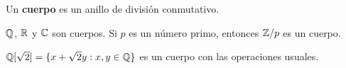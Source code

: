 \begin{definition}
Un \textbf{cuerpo} es un anillo de división conmutativo. 	
\end{definition}

\begin{examples}
$\mathbb{Q}$, $\mathbb{R}$ y $\mathbb{C}$ son cuerpos. Si $p$ es un número primo, entonces $\mathbb{Z}/p$ es un cuerpo.	
\end{examples}

\begin{example}
$\mathbb{Q}[\sqrt{2}]=\{x+\sqrt{2}y:x,y\in\mathbb{Q}\}$ es un cuerpo con las operaciones usuales. 	
\end{example}







